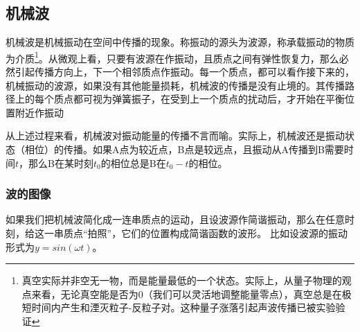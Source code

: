 
\subsection{机械波}
机械波是机械振动在空间中传播的现象。称振动的源头为波源，称承载振动的物质为介质\footnote{真空实际并非空无一物，而是能量最低的一个状态。实际上，从量子物理的观点来看，无论真空能是否为0（我们可以灵活地调整能量零点），真空总是在极短时间内产生和湮灭粒子-反粒子对。这种量子涨落引起声波传播已被实验验证}。从微观上看，只要有波源在作振动，且质点之间有弹性恢复力，那么必然引起传播方向上，下一个相邻质点作振动。每一个质点，都可以看作接下来的，机械振动的波源，如果没有其他能量损耗，机械波的传播是没有止境的。其传播路径上的每个质点都可视为弹簧振子，在受到上一个质点的扰动后，才开始在平衡位置附近作振动

从上述过程来看，机械波对振动能量的传播不言而喻。实际上，机械波还是振动状态（相位）的传播。如果A点为较近点，B点是较远点，且振动从A传播到B需要时间$t$，那么B在某时刻$t_0$的相位总是B在$t_0-t$的相位。
\subsubsection{波的图像}
如果我们把机械波简化成一连串质点的运动，且设波源作简谐振动，那么在任意时刻，给这一串质点“拍照”，它们的位置构成简谐函数的波形。
比如设波源的振动形式为$y=sin(\omega t)$。